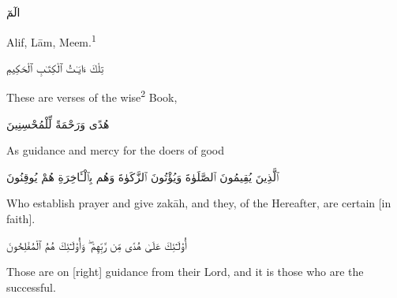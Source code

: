 \begin{edition*}
	\begin{Arabic}
		الٓمٓ
	\end{Arabic}
\end{edition*}

\begin{translation}
	Alif, Lām, Meem.\textsuperscript{1}
\end{translation}


\begin{edition*}
	\begin{Arabic}
		تِلْكَ ءَايَـٰتُ ٱلْكِتَـٰبِ ٱلْحَكِيمِ
	\end{Arabic}
\end{edition*}

\begin{translation}
	These are verses of the wise\textsuperscript{2} Book,
\end{translation}


\begin{edition*}
	\begin{Arabic}
		هُدًى وَرَحْمَةً لِّلْمُحْسِنِينَ
	\end{Arabic}
\end{edition*}

\begin{translation}
	As guidance and mercy for the doers of good
\end{translation}


\begin{edition*}
	\begin{Arabic}
		ٱلَّذِينَ يُقِيمُونَ ٱلصَّلَوٰةَ وَيُؤْتُونَ ٱلزَّكَوٰةَ وَهُم بِٱلْـَٔاخِرَةِ هُمْ يُوقِنُونَ
	\end{Arabic}
\end{edition*}

\begin{translation}
	Who establish prayer and give zakāh, and they, of the Hereafter, are certain [in faith].
\end{translation}


\begin{edition*}
	\begin{Arabic}
		أُو۟لَـٰٓئِكَ عَلَىٰ هُدًى مِّن رَّبِّهِمْ ۖ وَأُو۟لَـٰٓئِكَ هُمُ ٱلْمُفْلِحُونَ
	\end{Arabic}
\end{edition*}

\begin{translation}
	Those are on [right] guidance from their Lord, and it is those who are the successful.
\end{translation}


